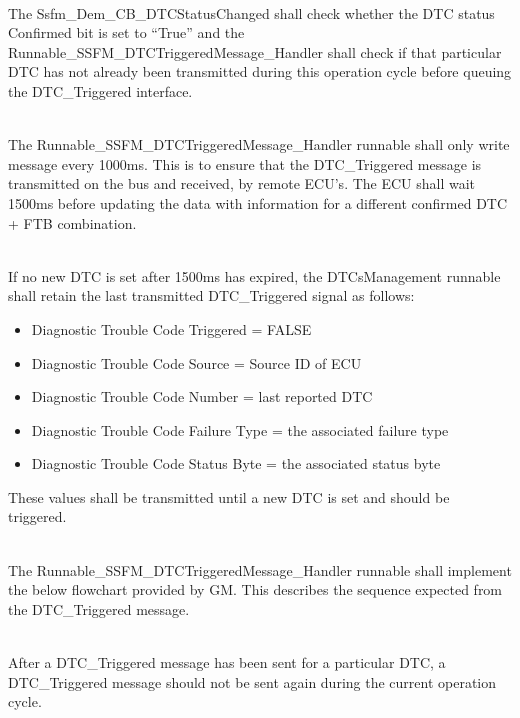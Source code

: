 \\
The Ssfm_Dem_CB_DTCStatusChanged shall check whether the DTC status Confirmed bit is set to “True” and the Runnable_SSFM_DTCTriggeredMessage_Handler shall check if that particular DTC has not already been transmitted during this operation cycle before queuing the DTC_Triggered interface.
{     }

\\
The Runnable_SSFM_DTCTriggeredMessage_Handler runnable shall only write message every 1000ms. This is to ensure that the DTC_Triggered message is transmitted on the bus and received, by remote ECU’s. The ECU shall wait 1500ms before updating the data with information for a different confirmed DTC + FTB combination.
{ }

\\
If no new DTC is set after 1500ms has expired, the DTCsManagement runnable shall retain the last transmitted DTC_Triggered signal as follows:
\begin{itemize}
    \item Diagnostic Trouble Code Triggered = FALSE
    \item Diagnostic Trouble Code Source = Source ID of ECU
    \item Diagnostic Trouble Code Number = last reported DTC
    \item Diagnostic Trouble Code Failure Type = the associated failure type
    \item Diagnostic Trouble Code Status Byte = the associated status byte
\end{itemize}
These values shall be transmitted until a new DTC is set and should be triggered.
{  }

\\
The Runnable_SSFM_DTCTriggeredMessage_Handler runnable shall implement the below flowchart provided by GM. This describes the sequence expected from the DTC_Triggered message.
{}

\\
After a DTC_Triggered message has been sent for a particular DTC, a DTC_Triggered message should not be sent again during the current operation cycle.
{ }

